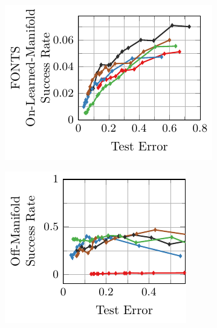 \begin{appendix}
\begin{figure}[t]
    \centering
    \vskip -0.4cm
    \begin{subfigure}{0.245\textwidth}
        \centering
        \includegraphics[width=\textwidth]{appendix_transfer_fonts_error_on_learned.pdf}
    \end{subfigure}
    \begin{subfigure}{0.225\textwidth}
        \centering
        \includegraphics[width=\textwidth]{appendix_transfer_fonts_error_off.pdf}
    \end{subfigure}
    \\
    \begin{subfigure}{0.245\textwidth}

\end{subfigure}
\end{figure}
\end{appendix}
